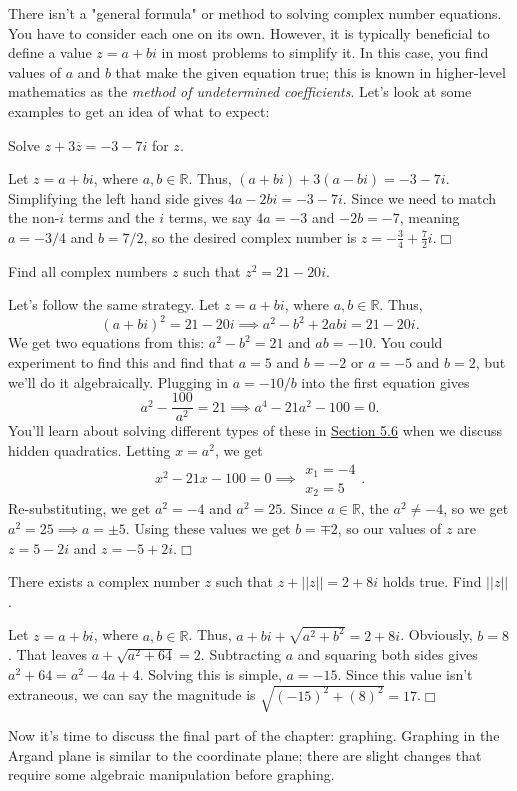 \documentclass[lang=en,11pt]{elegantbook}
\begin{document}
There isn't a "general formula" or method to solving complex number equations.  You have to consider each one on its own.  However, it is typically beneficial to define a value $z=a+bi$ in most problems to simplify it.  In this case, you find values of $a$ and $b$ that make the given equation true; this is known in higher-level mathematics as the \textit{method of undetermined coefficients}.  Let's look at some examples to get an idea of what to expect:
\begin{example}
Solve $z+3\overline{z}=-3-7i$ for $z$.
\end{example}
\begin{solution}
Let $z=a+bi$, where $a,b\in\mathbb{R}$.  Thus, $\left(a+bi\right)+3\left(a-bi\right)=-3-7i$.  Simplifying the left hand side gives $4a-2bi=-3-7i$.  Since we need to match the non-$i$ terms and the $i$ terms, we say $4a=-3$ and $-2b=-7$, meaning $a=-3/4$ and $b=7/2$, so the desired complex number is $\displaystyle z=-\frac{3}{4}+\frac{7}{2}i$.$\Box$
\end{solution}
\begin{example}
Find all complex numbers $z$ such that $z^2=21-20i$.
\end{example}
\begin{solution}
Let's follow the same strategy.  Let $z=a+bi$, where $a,b\in\mathbb{R}$.  Thus, $$\left(a+bi\right)^2=21-20i \implies a^2-b^2+2abi=21-20i.$$  We get two equations from this: $a^2-b^2=21$ and $ab=-10$.  You could experiment to find this and find that $a=5$ and $b=-2$ or $a=-5$ and $b=2$, but we'll do it algebraically.  Plugging in $\displaystyle a=-10/b$ into the first equation gives $$\displaystyle a^2-\frac{100}{a^2}=21 \implies a^4-21a^2-100=0.$$  You'll learn about solving different types of these in \hyperlink{section.5.6}{Section 5.6} when we discuss hidden quadratics.  Letting $x=a^2$, we get $$x^2-21x-100=0 \implies \begin{matrix} x_1=-4 \\ x_2=5 \end{matrix}.$$  Re-substituting, we get $a^2=-4$ and $a^2=25$.  Since $a\in\mathbb{R}$, the $a^2\neq -4$, so we get $a^2=25 \implies a=\pm 5$.  Using these values we get $b=\mp 2$, so our values of $z$ are $z=5-2i$ and $z=-5+2i$.$\Box$
\end{solution}
\begin{example}
There exists a complex number $z$ such that $z+||z||=2+8i$ holds true.  Find $||z||$.
\end{example}
\begin{solution}
Let $z=a+bi$, where $a,b\in\mathbb{R}$.  Thus, $a+bi+\sqrt{a^2+b^2}=2+8i$.  Obviously, $b=8$.  That leaves $a+\sqrt{a^2+64}=2$.  Subtracting $a$ and squaring both sides gives $a^2+64=a^2-4a+4$.  Solving this is simple, $a=-15$.  Since this value isn't extraneous, we can say the magnitude is $\sqrt{\left(-15\right)^2+\left(8\right)^2}=17$.$\Box$
\end{solution}
\noindent Now it's time to discuss the final part of the chapter: graphing.  Graphing in the Argand plane is similar to the coordinate plane; there are slight changes that require some algebraic manipulation before graphing.
\end{document}
